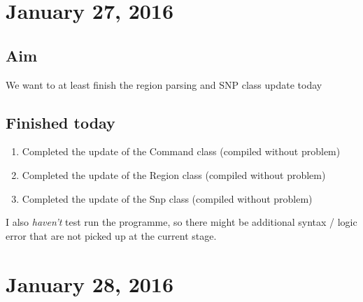 \documentclass[12pt]{article}
\begin{document}
	\section{January 27, 2016}
	\subsection{Aim}
	We want to at least finish the region parsing and SNP class update today
	\subsection{Finished today}
	\begin{enumerate}
		\item Completed the update of the Command class (compiled without problem)
		\item Completed the update of the Region class (compiled without problem)
		\item Completed the update of the Snp class (compiled without problem)
	\end{enumerate}
	I also \emph{haven't} test run the programme, so there might be additional syntax / logic error that are not picked up at the current stage.
	
	\section{January 28, 2016}
\end{document}

